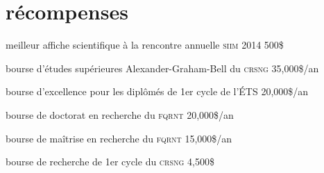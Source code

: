 \documentclass[]{friggeri-cv}
\newif\ifenglish
\begin{document}
\ifenglish\section{awards}\else\section{récompenses}\fi

\begin{entrylist}
  \ifenglish
    \entry {2014} {best scientific poster at the annual \textsc{siim} meeting} {500\$} {\vspace{-3mm}}
  \else
     {meilleur affiche scientifique à la rencontre annuelle \textsc{siim} 2014} {500\$} {\vspace{-3mm}}
  \fi
  \ifenglish
    \entry {2011} {\textsc{crsng} doctoral Alexander-Graham-Bell scholarship} {35,000\$/an} {\vspace{-3mm}}
  \else
     {bourse d’études supérieures Alexander-Graham-Bell du \textsc{crsng}} {35,000\$/an} {\vspace{-3mm}}
  \fi
  \ifenglish
    \entry {2011} {excellence scholarship for graduate student of the ÉTS} {20,000\$/an} {\vspace{-3mm}}
  \else
     {bourse d'excellence pour les diplômés de 1er cycle de l'ÉTS} {20,000\$/an} {\vspace{-3mm}}
  \fi
  \ifenglish
    \entry {2011} {\textsc{fqrnt} doctoral research scholarship} {20,000\$/an} {\vspace{-3mm}}
  \else
     {bourse de doctorat en recherche du \textsc{fqrnt}} {20,000\$/an} {\vspace{-3mm}}
  \fi
  \ifenglish
    \entry {2009} {\textsc{fqrnt} master's research scholarship} {15,000\$/an} {\vspace{-3mm}}
  \else
     {bourse de maîtrise en recherche du \textsc{fqrnt}} {15,000\$/an} {\vspace{-3mm}}
  \fi
  \ifenglish
    \entry {2006} {\textsc{crsng}  undergraduate student research awards} {4,500\$} {\vspace{-3mm}}
  \else
     {bourse de recherche de 1er cycle du \textsc{crsng}} {4,500\$} {\vspace{-3mm}}
  \fi
\end{entrylist}
\end{document}
